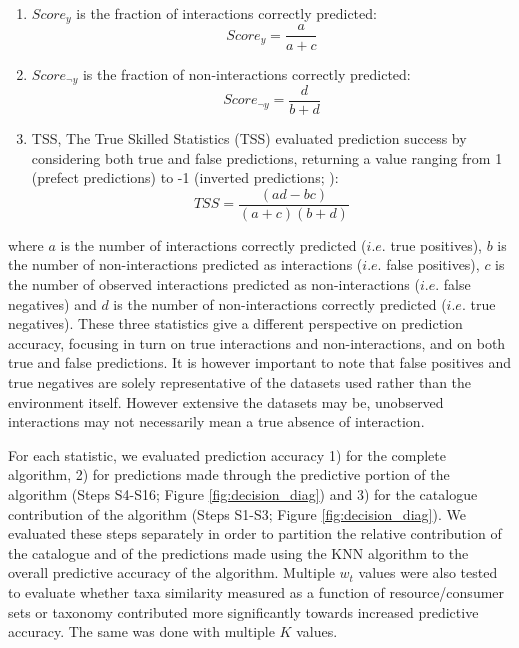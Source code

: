 \begin{enumerate}
 \item $Score_y$ is the fraction of interactions correctly predicted:
     \begin{equation}
         Score_y = \frac{a}{a + c}
     \end{equation}

 \item $Score_{\neg y}$ is the fraction of non-interactions correctly predicted:
     \begin{equation}
       Score_{\neg y}  = \frac{d}{b + d}
     \end{equation}

 \item TSS, The True Skilled Statistics (TSS) evaluated prediction success by considering both true and false predictions, returning a value ranging from 1 (prefect predictions) to -1 (inverted predictions; \cite{allouche2006}):
     \begin{equation}
       TSS = \frac{(ad - bc)}{(a + c)(b + d)}
     \end{equation}
\end{enumerate}

where $a$ is the number of interactions correctly predicted ($i.e.$ true positives), $b$ is the number of non-interactions predicted as interactions ($i.e.$ false positives), $c$ is the number of observed interactions predicted as non-interactions ($i.e.$ false negatives) and $d$ is the number of non-interactions correctly predicted ($i.e.$ true negatives). These three statistics give a different perspective on prediction accuracy, focusing in turn on true interactions and non-interactions, and on both true and false predictions. It is however important to note that false positives and true negatives are solely representative of the datasets used rather than the environment itself. However extensive the datasets may be, unobserved interactions may not necessarily mean a true absence of interaction.

For each statistic, we evaluated prediction accuracy 1) for the complete algorithm, 2) for predictions made through the predictive portion of the algorithm (Steps S4-S16; Figure \ref{fig:decision_diag}) and 3) for the catalogue contribution of the algorithm (Steps S1-S3; Figure \ref{fig:decision_diag}). We evaluated these steps separately in order to partition the relative contribution of the catalogue and of the predictions made using the KNN algorithm to the overall predictive accuracy of the algorithm. Multiple $w_t$ values were also tested to evaluate whether taxa similarity measured as a function of resource/consumer sets or taxonomy contributed more significantly towards increased predictive accuracy. The same was done with multiple $K$ values.

